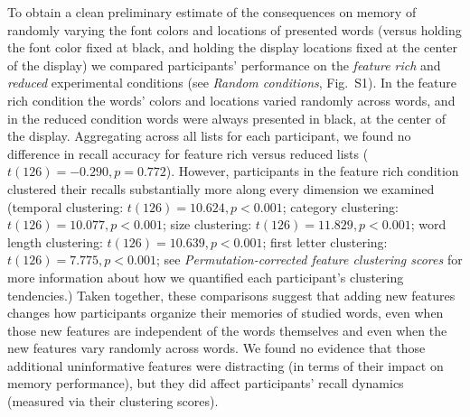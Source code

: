 \documentclass[11pt]{article}
\newcommand{\dynamicsRandom}{S1}
\begin{document}
To obtain a clean preliminary estimate of the consequences on memory of
randomly varying the font colors and locations of presented words (versus
holding the font color fixed at black, and holding the display locations fixed
at the center of the display) we compared participants' performance on the
\textit{feature rich} and \textit{reduced} experimental conditions (see
\textit{Random conditions}, Fig.~\dynamicsRandom). In the feature rich
condition the words' colors and locations varied randomly across words, and in
the reduced condition words were always presented in black, at the center of
the display. Aggregating across all lists for each participant, we found no
difference in recall accuracy for feature rich versus reduced lists ($t(126) =
-0.290, p = 0.772$). However, participants in the feature rich condition
clustered their recalls substantially more along every dimension we examined
(temporal clustering: $t(126) = 10.624, p < 0.001$; category clustering:
$t(126) = 10.077, p < 0.001$; size clustering: $t(126) = 11.829, p < 0.001$;
word length clustering: $t(126) = 10.639, p < 0.001$; first letter clustering:
$t(126) = 7.775, p < 0.001$; see \textit{Permutation-corrected feature
clustering scores} for more information about how we quantified each
participant's clustering tendencies.) Taken together, these comparisons suggest
that adding new features changes how participants organize their memories of
studied words, even when those new features are independent of the words
themselves and even when the new features vary randomly across words. We found
no evidence that those additional uninformative features were distracting (in
terms of their impact on memory performance), but they did affect participants'
recall dynamics (measured via their clustering scores).
\end{document}

